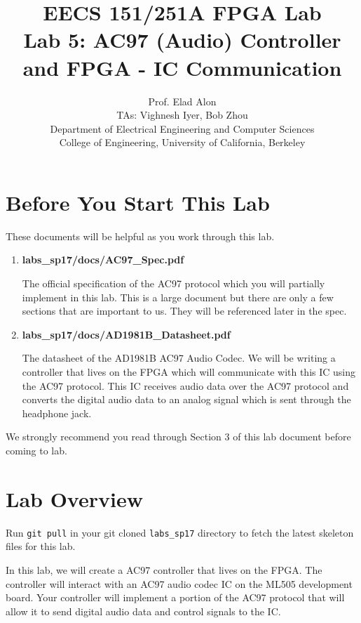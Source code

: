 \documentclass[11pt]{article}
\begin{document}
\title{EECS 151/251A FPGA Lab\\
Lab 5: AC97 (Audio) Controller and FPGA - IC Communication}

\author{Prof. Elad Alon \\
TAs: Vighnesh Iyer, Bob Zhou \\Department of Electrical Engineering and Computer Sciences\\
College of Engineering, University of California, Berkeley}
\date{}
\maketitle

\tableofcontents

\section{Before You Start This Lab}

These documents will be helpful as you work through this lab.

\begin{enumerate}
	\item \textbf{labs\_sp17/docs/AC97\_Spec.pdf}
	
	The official specification of the AC97 protocol which you will partially implement in this lab. This is a large document but there are only a few sections that are important to us. They will be referenced later in the spec.
	
	\item \textbf{labs\_sp17/docs/AD1981B\_Datasheet.pdf}
	
	The datasheet of the AD1981B AC97 Audio Codec. We will be writing a controller that lives on the FPGA which will communicate with this IC using the AC97 protocol. This IC receives audio data over the AC97 protocol and converts the digital audio data to an analog signal which is sent through the headphone jack.
\end{enumerate}

We strongly recommend you read through Section 3 of this lab document before coming to lab.

\section{Lab Overview}
Run \verb|git pull| in your git cloned \verb|labs_sp17| directory to fetch the latest skeleton files for this lab.

In this lab, we will create a AC97 controller that lives on the FPGA. The controller will interact with an AC97 audio codec IC on the ML505 development board. Your controller will implement a portion of the AC97 protocol that will allow it to send digital audio data and control signals to the IC.
\end{document}
